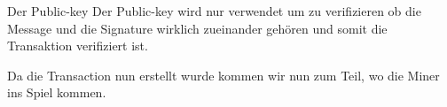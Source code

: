 \noindent
Der Public-key
Der Public-key wird nur verwendet um zu verifizieren ob die Message und die Signature wirklich zueinander gehören und somit die Transaktion verifiziert ist.

\noindent
Da die Transaction nun erstellt wurde kommen wir nun zum Teil, wo die Miner ins Spiel kommen.



\newpage

